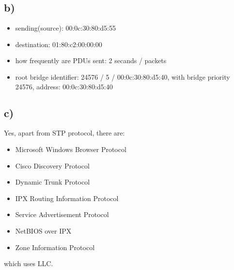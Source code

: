 \documentclass[11pt]{article}
\begin{document}
\subsection{b)}
\label{sec:orgaf0a29b}
\begin{itemize}
\item sending(source): 00:0c:30:80:d5:55
\item destination: 01:80:c2:00:00:00
\item how frequently are PDUs sent: 2 secands / packets
\item root bridge identifier: 24576 / 5 / 00:0c:30:80:d5:40, with bridge priority 24576, address: 00:0c:30:80:d5:40
\end{itemize}
\subsection{c)}
\label{sec:orga2442ee}
Yes, apart from STP protocol, there are:
\begin{itemize}
\item Microsoft Windows Browser Protocol
\item Cisco Discovery Protocol
\item Dynamic Trunk Protocol
\item IPX Routing Information Protocol
\item Service Advertisement Protocol
\item NetBIOS over IPX
\item Zone Information Protocol
\end{itemize}
which uses LLC.
\end{document}
